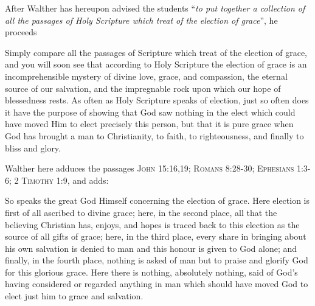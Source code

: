                 After Walther has hereupon advised the students “\textit{to put together a collection of all the passages of Holy Scripture which treat of the election of grace}”, he proceeds \begin{fancyquotes}Simply compare all the passages of Scripture which treat of the election of grace, and you will soon see that according to Holy Scripture the election of grace is an incomprehensible mystery of divine love, grace, and compassion, the eternal source of our salvation, and the impregnable rock upon which our hope of blessedness rests.  As often as Holy Scripture speaks of election, just so often does it have the purpose of showing that God saw nothing in the elect which could have moved Him to elect precisely this person, but that it is pure grace when God has brought a man to Christianity, to faith, to righteousness, and finally to bliss and glory.\end{fancyquotes}  Walther here adduces the passages {\scriptsize\textsc{John 15:16,19; Romans 8:28-30; Ephesians 1:3-6; 2 Timothy 1:9}}, and adds: \begin{fancyquotes}So speaks the great God Himself concerning the election of grace.  Here election is first of all ascribed to divine grace; here, in the second place, all that the believing Christian has, enjoys, and hopes is traced back to this election as the source of all gifts of grace; here, in the third place, every share in bringing about his own salvation is denied to man and this honour is given to God alone; and finally, in the fourth place, nothing is asked of man but to praise and glorify God for this glorious grace.  Here there is nothing, absolutely nothing, said of God’s having considered or regarded anything in man which should have moved God to elect just him to grace and salvation.\end{fancyquotes}

